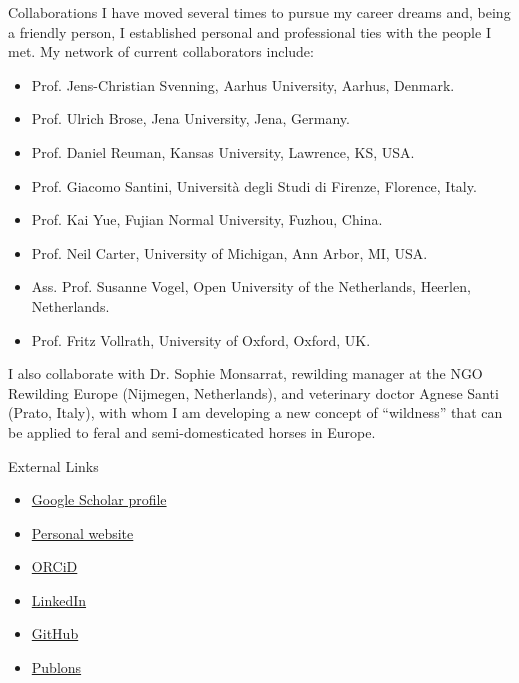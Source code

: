 \documentclass{resume} %
\begin{document}
\begin{rSection}{Collaborations}
I have moved several times to pursue my career dreams and, being a friendly person, I established personal and professional ties with the people I met.
My network of current collaborators include:
\begin{itemize}
\setlength\itemsep{-0.5em}
    \item Prof. Jens-Christian Svenning, Aarhus University, Aarhus, Denmark.
    \item Prof. Ulrich Brose, Jena University, Jena, Germany.
    \item Prof. Daniel Reuman, Kansas University, Lawrence, KS, USA.
    \item Prof. Giacomo Santini, Universit\`{a} degli Studi di Firenze, Florence, Italy.
    \item Prof. Kai Yue, Fujian Normal University, Fuzhou, China.
    \item Prof. Neil Carter, University of Michigan, Ann Arbor, MI, USA.
    \item Ass. Prof. Susanne Vogel, Open University of the Netherlands, Heerlen, Netherlands.
    \item Prof. Fritz Vollrath, University of Oxford, Oxford, UK.
\end{itemize}
I also collaborate with Dr. Sophie Monsarrat, rewilding manager at the NGO Rewilding Europe (Nijmegen, Netherlands), and veterinary doctor Agnese Santi (Prato, Italy), with whom I am developing a new concept of ``wildness'' that can be applied to feral and semi-domesticated horses in Europe.
\end{rSection}

\begin{rSection}{External Links}
\begin{minipage}{0.5\textwidth}
\begin{itemize}
    \item \href{https://scholar.google.com/citations?user=5KPh-oUAAAAJ&hl=en}{Google Scholar profile}
    \item \href{https://emilio-berti.github.io/}{Personal website}
    \item \href{https://orcid.org/0000-0001-9286-011X}{ORCiD}
\end{itemize}
\end{minipage}
\begin{minipage}{0.5\textwidth}
\begin{itemize}
    \item \href{https://www.linkedin.com/in/emilio-berti-55a348146}{LinkedIn}
    \item \href{https://github.com/emilio-berti}{GitHub}
    \item \href{https://publons.com/wos-op/researcher/4208953/emilio-berti/peer-review/}{Publons}
\end{itemize}
\end{minipage}
\end{rSection}
\end{document}
